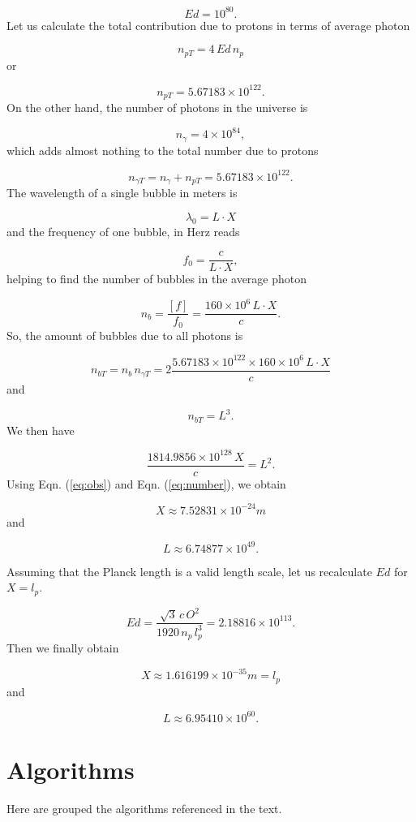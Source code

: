 \documentclass[12pt,english]{article}
\begin{document}
\[
Ed=10^{80}.
\]
Let us calculate the total contribution due to protons in terms of
average photon

\[
n_{pT}=4\,Ed\,n_{p}
\]
or

\[
n_{pT}=5.67183\times10^{122}.
\]
On the other hand, the number of photons in the universe is

\[
n_{\gamma}=4\times10^{84},
\]
which adds almost nothing to the total number due to protons

\[
n_{\gamma T}=n_{\gamma}+n_{pT}=5.67183\times10^{122}.
\]
The wavelength of a single bubble in meters is

\[
\lambda_{0}=L\cdot X
\]
and the frequency of one bubble, in Herz reads

\[
f_{0}=\frac{c}{L\cdot X},
\]
helping to find the number of bubbles in the average photon

\[
n_{b}=\frac{[f]}{f_{0}}=\frac{160\times10^{6}\,L\cdot X}{c}.
\]
So, the amount of bubbles due to all photons is

\[
n_{bT}=n_{b}\,n_{\gamma T}=2\frac{5.67183\times10^{122}\times160\times10^{6}\,L\cdot X}{c}
\]
and

\[
n_{bT}=L^{3}.
\]
We then have

\begin{equation}
\frac{1814.9856\times10^{128}\,X}{c}=L^{2}.\label{eq:number}
\end{equation}
Using Eqn. (\ref{eq:obs}) and Eqn. (\ref{eq:number}), we obtain 

\[
X\approx7.52831\times10^{-24}m
\]
and

\[
L\approx6.74877\times10^{49}.
\]

Assuming that the Planck length is a valid length scale, let us recalculate
$Ed$ for $X=l_{p}$.

\[
Ed=\frac{\sqrt{3}\,c\,O^{2}}{1920\,n_{p}\,l_{p}^{3}}=2.18816\times10^{113}.
\]
Then we finally obtain

\[
X\approx1.616199\times10^{-35}m=l_{p}
\]
and

\[
L\approx6.95410\times10^{60}.
\]

\newpage{}

\section{Algorithms \label{sec:algorithms}}
Here are grouped the algorithms referenced in the text.

\end{document}
